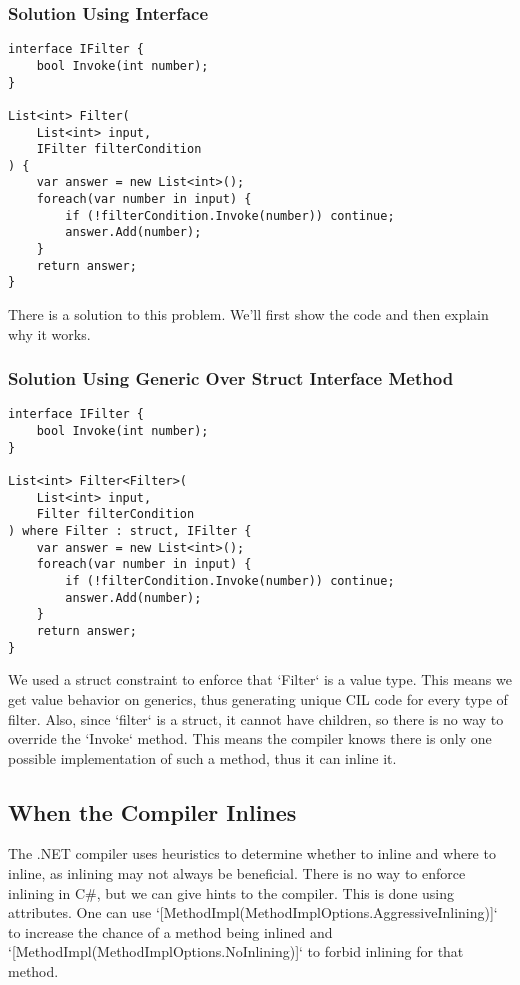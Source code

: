\subsubsection{Solution Using Interface}
\begin{lstlisting}
interface IFilter {
    bool Invoke(int number);
}

List<int> Filter(
    List<int> input, 
    IFilter filterCondition
) {
    var answer = new List<int>();
    foreach(var number in input) {
        if (!filterCondition.Invoke(number)) continue;
        answer.Add(number);
    }
    return answer;
}
\end{lstlisting}

There is a solution to this problem. We'll first show the code and then explain why it works.

\subsubsection{Solution Using Generic Over Struct Interface Method}
\begin{lstlisting}
interface IFilter {
    bool Invoke(int number);
}

List<int> Filter<Filter>(
    List<int> input, 
    Filter filterCondition
) where Filter : struct, IFilter {
    var answer = new List<int>();
    foreach(var number in input) {
        if (!filterCondition.Invoke(number)) continue;
        answer.Add(number);
    }
    return answer;
}
\end{lstlisting}

We used a struct constraint to enforce that `Filter` is a value type. This means we get value behavior on generics, thus generating unique CIL code for every type of filter. Also, since `filter` is a struct, it cannot have children, so there is no way to override the `Invoke` method. This means the compiler knows there is only one possible implementation of such a method, thus it can inline it.

\subsection{When the Compiler Inlines}
The .NET compiler uses heuristics to determine whether to inline and where to inline, as inlining may not always be beneficial. There is no way to enforce inlining in C\#, but we can give hints to the compiler. This is done using attributes. One can use `[MethodImpl(MethodImplOptions.AggressiveInlining)]` to increase the chance of a method being inlined and `[MethodImpl(MethodImplOptions.NoInlining)]` to forbid inlining for that method.

